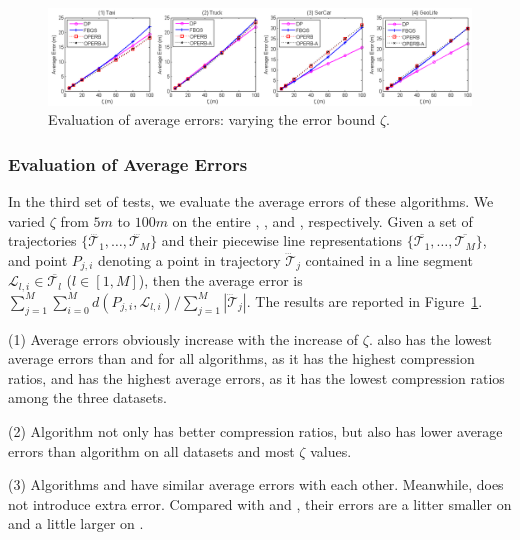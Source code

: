 \begin{figure}[tb]
\centering
\includegraphics[scale = 0.465]{figures/exp-averageerror.png}
\vspace{-2ex}
\caption{\small Evaluation of average errors: varying the error bound $\zeta$.}
\label{fig:ae}
\vspace{-2ex}
\end{figure}


\vspace{-0.5ex}
\subsubsection{Evaluation of Average Errors}
In the third set of tests, we evaluate the average errors of these algorithms.
We varied $\zeta$ from $5m$ to $100m$ on the entire \taxi, \truck, \sercar and \geolife, respectively.
Given a set of trajectories $\{\dddot{\mathcal{T}_1}, \ldots, \dddot{\mathcal{T}_M}\}$ and their piecewise line representations
$\{\overline{\mathcal{T}_1}, \ldots, \overline{\mathcal{T}_M}\}$, and point $P_{j,i}$ denoting
a point in trajectory $\dddot{\mathcal{T}}_j$ contained in a line segment $\mathcal{L}_{l,i}\in\overline{\mathcal{T}_l}$ ($l\in[1,M]$),
then the average error is $\sum_{j=1}^{M}\sum_{i=0}^{M} d(P_{j,i},
\mathcal{L}_{l,i})/\sum_{j=1}^{M}{|\dddot{\mathcal{T}}_j |}$.
The results are reported in Figure~\ref{fig:ae}.

\sstab(1) Average errors obviously increase with the increase of $\zeta$. \taxi also has the lowest average errors than \truck and \sercar for all algorithms,
as it has the highest compression ratios, and \sercar has the highest average errors, as it has the lowest compression ratios among the three datasets.

\sstab(2) Algorithm \dpa not only has better compression ratios, but also has lower average errors than algorithm \fbqsa on all datasets and most $\zeta$ values.

\sstab(3) Algorithms \operb and \operba have similar average errors with each other. Meanwhile, \operba does not introduce extra error. Compared with \dpa and \fbqsa, their errors are a litter smaller on \taxi and a little larger on \sercar.







